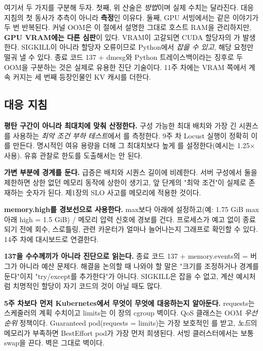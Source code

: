 \vspace{3.0pt}

여기서 두 가지를 구분해 두자. 첫째, 위 산술은 \textit{방법}이며 실제 수치는 달라진다. 대응 지침의 첫 동사가 추측이 아니라 \textbf{측정}인 이유다. 둘째, GPU 서빙에서는 같은 이야기가 두 번 반복된다. 커널 OOM은 이 절에서 설명한 그대로 호스트 RAM을 관리하지만, \textbf{GPU VRAM에는 다른 심판}이 있다. VRAM이 고갈되면 CUDA 할당자의 가 발생한다. SIGKILL이 아니라 할당자 오류이므로 Python에서 \textit{잡을 수 있고}, 해당 요청만 떨궈 낼 수 있다. 종료 코드 137 + dmesg와 Python 트레이스백이라는 징후로 두 OOM을 구분하는 것은 실제로 유용한 진단 기술이다. 11주 차에는 VRAM 쪽에서 계속 커지는 세 번째 등장인물인 KV 캐시를 더한다.

\subsection*{대응 지침}

\begin{tbbitemize}
  \item \textbf{평탄 구간이 아니라 최대치에 맞춰 산정한다.} 구성 가능한 최대 배치와 가장 긴 시퀀스를 사용하는 \textit{최악 조건 부하 테스트}에서 를 측정한다. 9주 차 Locust 실행이 정확히 이를 만든다. 명시적인 여유 용량을 더해 그 최대치보다 높게 를 설정한다(예시는 1.25× 사용). 유휴 관찰로 한도를 도출해서는 안 된다.
  \item \textbf{가변 부분에 경계를 둔다.} 급증은 배치와 시퀀스 길이에 비례한다. 서버 구성에서 둘을 제한하면 상한 없던 메모리 동작에 상한이 생기고, 앞 단계의 "최악 조건"이 실제로 존재하는 숫자가 된다. 제1장의 SLO 사고를 메모리에 적용한 것이다.
  \item \textbf{memory.high를 경보선으로 사용한다.} max보다 아래에 설정하고(예: 1.75 GiB max 아래 high = 1.5 GiB)  / 메모리 압력 신호에 경보를 건다. 프로세스가 예고 없이 종료되기 전에 회수, 스로틀링, 관련 카운터가 얼마나 늘어나는지 그래프로 확인할 수 있다. 14주 차에 대시보드로 연결한다.
  \item \textbf{137을 수수께끼가 아니라 진단으로 읽는다.} 종료 코드 137 + memory.events의  = 버그가 아니라 예산 문제다. 해결을 논의할 때 나와야 할 말은 "크기를 조정하거나 경계를 둔다"이지 "try/except를 추가한다"가 아니다. SIGKILL은 잡을 수 없고, 계산 예시처럼 치명적인 할당이 자기 코드의 것이 아닐 때도 많다.
  \item \textbf{5주 차보다 먼저 Kubernetes에서 무엇이 무엇에 대응하는지 알아둔다.} requests는 스케줄러의 계획 수치이고 limits는 이 장의 cgroup 벽이다. QoS 클래스는 OOM \textit{우선순위} 정책이다. Guaranteed pod(requests = limits)는 가장 보호적인 를 받고, \textit{노드}의 메모리가 부족하면 BestEffort pod가 가장 먼저 희생된다. 서빙 클러스터에서는 보통 swap을 끈다. 벽은 그대로 벽이다.
\end{tbbitemize}

